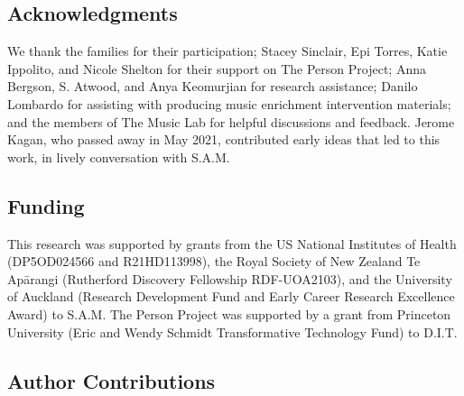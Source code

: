 \documentclass[
]{article}
\begin{document}
\subsection*{Acknowledgments}\label{acknowledgments}

We thank the families for their participation; Stacey Sinclair, Epi
Torres, Katie Ippolito, and Nicole Shelton for their support on The
Person Project; Anna Bergson, S. Atwood, and Anya Keomurjian for
research assistance; Danilo Lombardo for assisting with producing music
enrichment intervention materials; and the members of The Music Lab for
helpful discussions and feedback. Jerome Kagan, who passed away in May
2021, contributed early ideas that led to this work, in lively
conversation with S.A.M.

\subsection*{Funding}\label{funding}

This research was supported by grants from the US National Institutes of
Health (DP5OD024566 and R21HD113998), the Royal Society of New Zealand
Te Apārangi (Rutherford Discovery Fellowship RDF-UOA2103), and the
University of Auckland (Research Development Fund and Early Career
Research Excellence Award) to S.A.M. The Person Project was supported by
a grant from Princeton University (Eric and Wendy Schmidt Transformative
Technology Fund) to D.I.T.

\subsection*{Author Contributions}\label{author-contributions}
\end{document}
